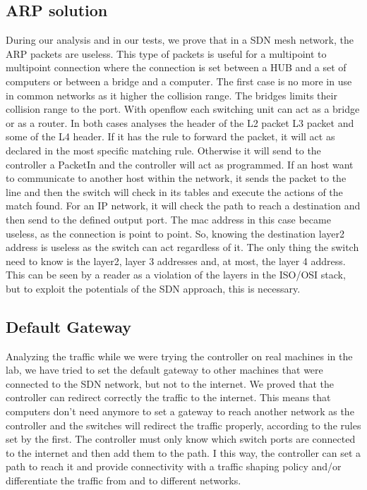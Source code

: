 \documentclass[article,10pt]{IEEEtran}
\begin{document}
\subsection{ARP solution}
During our analysis and in our tests, we prove that in a SDN mesh network, the ARP packets are useless.
This type of packets is useful for a multipoint to multipoint connection where the connection is set between a
HUB and a set of computers or between a bridge and a computer. The first case is no more in use in common networks as
it higher the collision range. The bridges limits their collision range to the port. With openflow each switching unit can
act as a bridge or as a router. In both cases analyses the header of the L2 packet L3 packet and some of the L4 header.
If it has the rule to forward the packet, it will act as declared in the most specific matching rule. Otherwise it will
send to the controller a PacketIn and the controller will act as programmed. If an host want to communicate to another host within
the network, it sends the packet to the line and then the switch will check in its tables and execute the actions of the match found.
For an IP network, it will check the path to reach a destination and then send to the defined output port. The mac address in this case
became useless, as the connection is point to point. So, knowing the destination layer2 address is useless as the switch can act
regardless of it. The only thing the switch need to know is the layer2, layer 3 addresses and, at most, the layer 4 address.
This can be seen by a reader as a violation of the layers in the ISO/OSI stack, but to exploit the potentials of the SDN approach,
this is necessary.

\subsection{Default Gateway}

Analyzing the traffic while we were trying the controller on real machines in the lab, we have tried to set the default gateway to
other machines that were connected to the SDN network, but not to the internet. We proved that the controller can redirect correctly the
traffic to the internet. This means that
computers don't need anymore to set a gateway to reach another network as the controller and the switches will redirect the traffic
properly, according to the rules set by the first. The controller must only know which switch ports are connected to the
internet and then add them to the path. I this way, the controller can set a path to reach it and provide connectivity with
a traffic shaping policy and/or differentiate the traffic from and to different networks.
\end{document}
